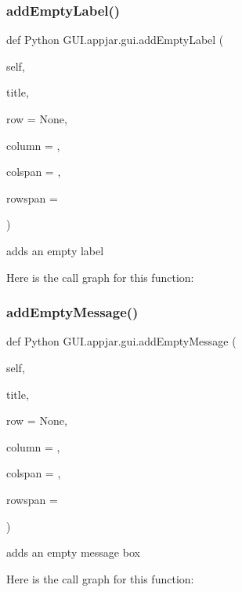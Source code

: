 \subsubsection{\texorpdfstring{add\+Empty\+Label()}{addEmptyLabel()}}
{\footnotesize\ttfamily def Python G\+U\+I.\+appjar.\+gui.\+add\+Empty\+Label (\begin{DoxyParamCaption}\item[{}]{self,  }\item[{}]{title,  }\item[{}]{row = {\ttfamily None},  }\item[{}]{column = {},  }\item[{}]{colspan = {},  }\item[{}]{rowspan = {} }\end{DoxyParamCaption})}

\begin{DoxyVerb}adds an empty label \end{DoxyVerb}
 Here is the call graph for this function\+:
\mbox{\label{class_python_01_g_u_i_1_1appjar_1_1gui_aa9f4d3a2a2fc3c7106677fa4d951d9a5}} 
\subsubsection{\texorpdfstring{add\+Empty\+Message()}{addEmptyMessage()}}
{\footnotesize\ttfamily def Python G\+U\+I.\+appjar.\+gui.\+add\+Empty\+Message (\begin{DoxyParamCaption}\item[{}]{self,  }\item[{}]{title,  }\item[{}]{row = {\ttfamily None},  }\item[{}]{column = {},  }\item[{}]{colspan = {},  }\item[{}]{rowspan = {} }\end{DoxyParamCaption})}

\begin{DoxyVerb}adds an empty message box \end{DoxyVerb}
 Here is the call graph for this function\+:
\mbox{\label{class_python_01_g_u_i_1_1appjar_1_1gui_ad3faf4a418564aa40e50ee28b569348d}} 
